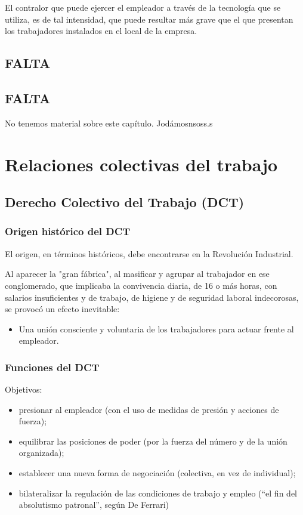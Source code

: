 \documentclass[spanish,12pt,a4paper,titlepage]{report}
\begin{document}
El contralor que puede ejercer el empleador a través de la tecnología que se utiliza, es de tal intensidad, que puede resultar más grave que el que presentan los trabajadores instalados en el local de la empresa.\\

\chapter{FALTA}
\chapter{FALTA}
No tenemos material sobre este capítulo.
Jodámosnsoss.s

\part{Relaciones colectivas del trabajo}
\label{part:relaciones-colectivas-de-trabajo}

\chapter{Derecho Colectivo del Trabajo (DCT)}

\section{Origen histórico del DCT}
\label{sec:origen-historico-del-dct}

El origen, en términos históricos, debe encontrarse en la Revolución Industrial.

Al aparecer la "gran fábrica", al masificar y agrupar al trabajador en ese conglomerado, que implicaba la convivencia diaria, de 16 o más horas, con salarios insuficientes y de trabajo, de higiene y de seguridad laboral indecorosas, se provocó un efecto inevitable:
\begin{itemize}
\item Una unión consciente y voluntaria de los trabajadores para actuar frente al empleador.
\end{itemize}

\section{Funciones del DCT}
\label{sec:funciones-del-dct}

Objetivos:
\begin{itemize}
\item presionar al empleador (con el uso de medidas de presión y acciones de fuerza);
\item equilibrar las posiciones de poder (por la fuerza del número y de la unión organizada);
\item establecer una nueva forma de negociación (colectiva, en vez  de individual);
\item bilateralizar la regulación de las condiciones de trabajo y empleo (“el fin del absolutismo patronal”, según De Ferrari)
\end{itemize}
\end{document}
